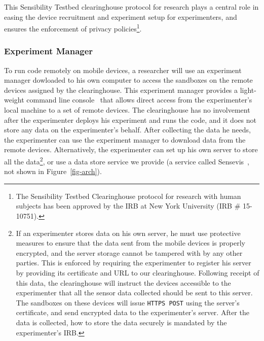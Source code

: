 This Sensibility Testbed
clearinghouse protocol for research plays a central role in
easing the device recruitment and experiment setup for experimenters, 
and ensures the enforcement
of privacy policies\footnote{\scriptsize The Sensibility Testbed Clearinghouse
protocol for research with human subjects has been approved by
the IRB at New York University (IRB \# 15-10751).}. 

\subsubsection{Experiment Manager}\label{sec-emt}

To run code remotely on mobile devices, a researcher will use an
experiment manager dowloaded to his own computer 
to access the sandboxes on the remote devices assigned by the clearinghouse. 
This experiment manager provides a light-weight command line 
console~\cite{demo-kit} that allows direct access from the 
experimenter's local machine to a set of remote devices. 
The clearinghouse has no involvement after the experimenter deploys 
his experiment and runs the code, and it does not store any
data on the experimenter's behalf. After collecting the data he needs, the
experimenter can use the experiment manager to download data from the remote devices. 
Alternatively, the experimenter can set up his own server to store all 
the data\footnote{\scriptsize
If an experimenter stores data on his own server, he must use protective
measures to ensure that the data sent from the mobile devices is
properly encrypted, and the server storage cannot be tampered
with by any other parties. This is enforced by requiring the experimenter to register
his server by providing its certificate and URL to our
clearinghouse. Following receipt of this data, the clearinghouse will instruct the devices
accessible to the experimenter that all the sensor data collected should be
sent to this server. The sandboxes on these devices will issue
\texttt{HTTPS POST} using the server's certificate, and send encrypted
data to the experimenter's server. After the data is collected, how to store
the data securely is mandated by the experimenter's IRB.}, or use a data 
store service we provide (a service called Sensevis~\cite{sensevis}, 
not shown in Figure~\ref{fig-arch}).

